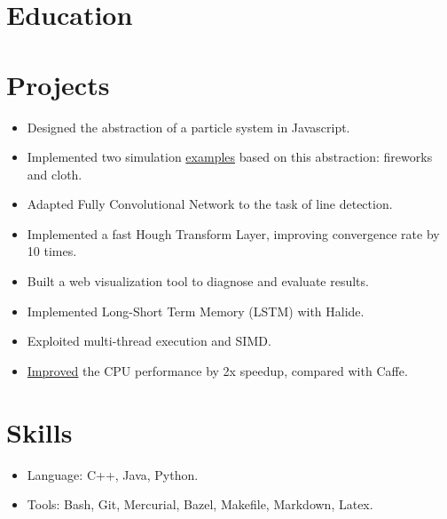 \documentclass[letterpaper,11pt]{article}
\begin{document}
\section*{Education}
\begin{itemize}
\end{itemize}

\section*{Projects}

\begin{itemize}
  \begin{itemize}
  \item Designed the abstraction of a particle system in Javascript.
  \item Implemented two simulation \href{https://misaka-10032.github.io/particle-system/}{examples} based on this abstraction: fireworks and cloth.
  \end{itemize}
  \begin{itemize}
  \item Adapted Fully Convolutional Network to the task of line detection.
  \item Implemented a fast Hough Transform Layer, improving convergence rate by 10 times.
  \item Built a web visualization tool to diagnose and evaluate results.
  \end{itemize}
  \begin{itemize}
  \item Implemented Long-Short Term Memory (LSTM) with Halide.
  \item Exploited multi-thread execution and SIMD.
  \item \href{http://misaka-10032.github.io/Halstm/}{Improved} the CPU performance by 2x speedup, compared with Caffe.
  \end{itemize}
\end{itemize}

\section*{Skills}
\begin{itemize}
\item Language: C++, Java, Python.
\item Tools: Bash, Git, Mercurial, Bazel, Makefile, Markdown, Latex.
\end{itemize}
\end{document}
